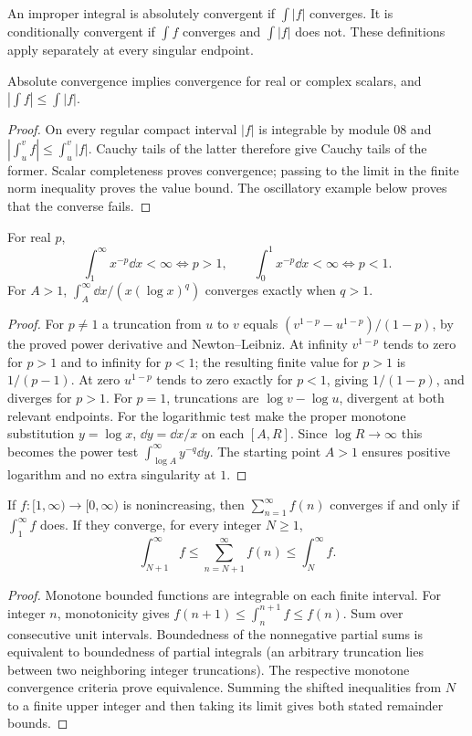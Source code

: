 \begin{definition}
An improper integral is absolutely convergent if $\int|f|$ converges.
It is conditionally convergent if $\int f$ converges and $\int|f|$
does not. These definitions apply separately at every singular endpoint.
\end{definition}
\begin{theorem}
Absolute convergence implies convergence for real or complex scalars,
and $|\int f|\le\int|f|$.
\end{theorem}
\begin{proof}
On every regular compact interval $|f|$ is integrable by module 08 and
$|\int_u^vf|\le\int_u^v|f|$. Cauchy tails of the latter therefore
give Cauchy tails of the former. Scalar completeness proves convergence;
passing to the limit in the finite norm inequality proves the value bound.
The oscillatory example below proves that the converse fails.
\end{proof}

\begin{theorem}
For real $p$,
\[\int_1^\infty x^{-p}\dd x<\infty\iff p>1,\qquad
\int_0^1 x^{-p}\dd x<\infty\iff p<1.
\]
For $A>1$, $\int_A^\infty\dd x/(x(\log x)^q)$ converges exactly
when $q>1$.
\end{theorem}
\begin{proof}
For $p\ne1$ a truncation from $u$ to $v$ equals
$(v^{1-p}-u^{1-p})/(1-p)$, by the proved power derivative and
Newton--Leibniz. At infinity $v^{1-p}$ tends to zero for $p>1$
and to infinity for $p<1$; the resulting finite value for $p>1$ is
$1/(p-1)$. At zero $u^{1-p}$ tends to zero exactly for $p<1$,
giving $1/(1-p)$, and diverges for $p>1$.
For $p=1$, truncations are $\log v-\log u$, divergent at both
relevant endpoints. For the logarithmic test make the proper monotone
substitution $y=\log x$, $\dd y=\dd x/x$ on each $[A,R]$.
Since $\log R\to\infty$ this becomes the power test
$\int_{\log A}^\infty y^{-q}\dd y$. The starting point $A>1$
ensures positive logarithm and no extra singularity at $1$.
\end{proof}

\begin{theorem}
If $f:[1,\infty)\to[0,\infty)$ is nonincreasing, then
$\sum_{n=1}^{\infty}f(n)$ converges if and only if $\int_1^\infty f$
does. If they converge, for every integer $N\ge1$,
\[\int_{N+1}^{\infty}f\le\sum_{n=N+1}^{\infty}f(n)
\le\int_N^{\infty}f.
\]
\end{theorem}
\begin{proof}
Monotone bounded functions are integrable on each finite interval.
For integer $n$, monotonicity gives
$f(n+1)\le\int_n^{n+1}f\le f(n)$.
Sum over consecutive unit intervals. Boundedness of the nonnegative
partial sums is equivalent to boundedness of partial integrals (an
arbitrary truncation lies between two neighboring integer truncations).
The respective monotone convergence criteria prove equivalence.
Summing the shifted inequalities from $N$ to a finite upper integer
and then taking its limit gives both stated remainder bounds.
\end{proof}

